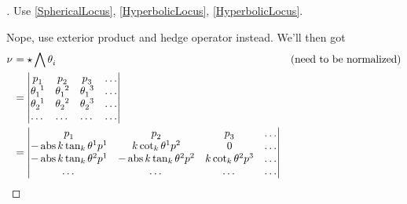 \documentclass[stu, babel, american, biblatex, a4paper, draftall]{apa7}
\begin{document}
\begin{proof}[]
    \skipped

    Use \cref{SphericalLocus}, \cref{HyperbolicLocus}, \cref{HyperbolicLocus}.

    Nope, use exterior product and hedge operator instead.
    We'll then got
    \begin{align*}
        \tensor{\nu}{}
                    & = \star\bigwedge{\tensor{\theta}{_i}}                                                                        & \text{(need to be normalized)} \\
                    & = \left\vert
        \begin{matrix}
            \tensor{p}{_1}        & \tensor{p}{_2}        & \tensor{p}{_3}        & \dots \\
            \tensor{\theta}{_1^1} & \tensor{\theta}{_1^2} & \tensor{\theta}{_1^3} & \dots \\
            \tensor{\theta}{_2^1} & \tensor{\theta}{_2^2} & \tensor{\theta}{_2^3} & \dots \\
            \dots                 & \dots                 & \dots                 & \dots \\
        \end{matrix}
        \right\vert                                                                                                                                                 \\
                    & = \left\vert
        \begin{matrix}
            \tensor{p}{_1}                                    & \tensor{p}{_2}                                    & \tensor{p}{_3}                             & \dots \\
            -\abs{k}\tan_k{\tensor{\theta}{^1}}\tensor{p}{^1} & k\cot_k{\tensor{\theta}{^1}}\tensor{p}{^2}        & 0                                          & \dots \\
            -\abs{k}\tan_k{\tensor{\theta}{^2}}\tensor{p}{^1} & -\abs{k}\tan_k{\tensor{\theta}{^2}}\tensor{p}{^2} & k\cot_k{\tensor{\theta}{^2}}\tensor{p}{^3} & \dots \\
            \dots                                             & \dots                                             & \dots                                      & \dots \\
        \end{matrix}
        \right\vert                                                                                                                                                 \\

\end{align*}
\end{proof}
\end{document}
